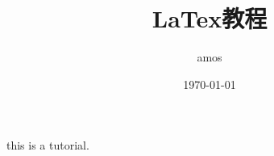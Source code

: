 \documentclass[UTF8]{ctexart}
\begin{document}
\title{LaTex教程}
\author{amos}
\date{\today}
\maketitle
    this is a tutorial.
\end{document}

